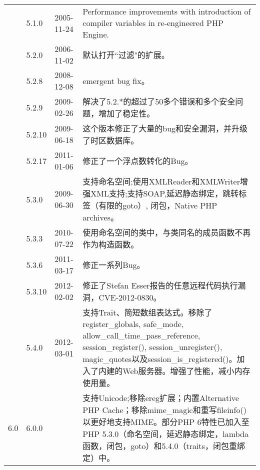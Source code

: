 \begin{longtable}{|m{16pt}|m{20pt}|m{35pt}|m{300pt}|}
		&5.1.0	&2005-11-24	&Performance improvements with introduction of compiler variables in re-engineered PHP Engine.\\ \cline{2-4}

		&5.2.0	&2006-11-02	&默认打开``过滤"的扩展。\\ \cline{2-4}

		&5.2.8	&2008-12-08	&emergent bug fix。\\ \cline{2-4}

		&5.2.9	&2009-02-26	&解决了5.2.*的超过了50多个错误和多个安全问题，增加了稳定性。\\ \cline{2-4}

		&5.2.10&2009-06-18	&这个版本修正了大量的bug和安全漏洞，并升级了时区数据库。\\ \cline{2-4}

		&5.2.17&2011-01-06	&修正了一个浮点数转化的Bug。\\ \cline{2-4}

		&5.3.0	&2009-06-30	&支持命名空间;\newline 使用XMLReader和XMLWriter增强XML支持;\newline 支持SOAP,延迟静态绑定，跳转标签（有限的goto）, 闭包，Native PHP archives。\\ \cline{2-4}

		&5.3.3	&2010-07-22	&使用命名空间的类中，与类同名的成员函数不再作为构造函数。\\ \cline{2-4}

		&5.3.6	&2011-03-17	&修正一系列Bug。\\ \cline{2-4}

		&5.3.10&2012-02-02	&修正了Stefan Esser报告的任意远程代码执行漏洞，CVE-2012-0830。\\ \cline{2-4}

		&5.4.0	&2012-03-01	&支持Trait、简短数组表达式。\newline 移除了register\_globals, safe\_mode, allow\_call\_time\_pass\_reference, session\_register(), session\_unregister(), magic\_quotes以及session\_is\_registered()。\newline 加入了内建的Web服务器。\newline 增强了性能，减小内存使用量。\\ \cline{2-4}
\hline
6.0		&6.0.0	&	&支持Unicode;移除ereg扩展；\newline 内置Alternative PHP Cache；\newline 移除mime\_magic和重写fileinfo()以更好地支持MIME。\newline 部分PHP 6特性已加入至PHP 5.3.0（命名空间，延迟静态绑定，lambda函数，闭包，goto）和5.4.0（traits，闭包重绑定）中。\\ 
\hline
\end{longtable}




